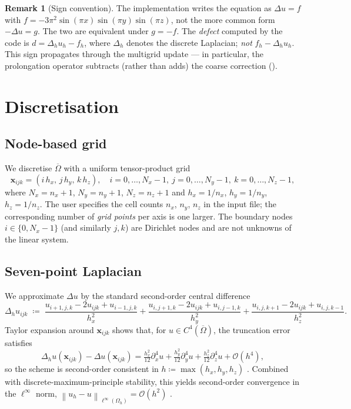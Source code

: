 \documentclass[11pt]{article}
\theoremstyle{definition}
\newtheorem{remark}[theorem]{Remark}
\newcommand{\bx}{\mathbf{x}}
\newcommand{\norm}[1]{\left\lVert #1 \right\rVert}
\newcommand{\bigO}{\mathcal{O}}
\begin{document}
\begin{remark}[Sign convention]
The implementation writes the equation as $\Delta u = f$ with $f =
-3\pi^2 \sin(\pi x)\sin(\pi y)\sin(\pi z)$, not the more common form
$-\Delta u = g$.  The two are equivalent under $g=-f$.  The
\emph{defect} computed by the code is
$d = \Delta_h u_h - f_h$, where $\Delta_h$ denotes the discrete
Laplacian; \emph{not} $f_h - \Delta_h u_h$.  This sign propagates
through the multigrid update --- in particular, the prolongation
operator subtracts (rather than adds) the coarse correction
().
\end{remark}

\section{Discretisation}\label{sec:discretisation}

\subsection{Node-based grid}
We discretise $\overline{\Omega}$ with a uniform tensor-product grid
\begin{equation*}
  \bx_{ijk} = (i\,h_x,\,j\,h_y,\,k\,h_z),\quad
  i=0,\dots,N_x-1,\ j=0,\dots,N_y-1,\ k=0,\dots,N_z-1,
\end{equation*}
where $N_x = n_x+1$, $N_y = n_y+1$, $N_z = n_z+1$ and $h_x = 1/n_x$,
$h_y = 1/n_y$, $h_z = 1/n_z$.  The user specifies the cell counts $n_x$,
$n_y$, $n_z$ in the input file; the corresponding number of
\emph{grid points} per axis is one larger.  The boundary nodes $i\in\{0,N_x-1\}$
(and similarly $j,k$) are Dirichlet nodes and are not unknowns of the
linear system.

\subsection{Seven-point Laplacian}
We approximate $\Delta u$ by the standard second-order central
difference
\begin{equation}\label{eq:laplacian-7pt}
  \Delta_h u_{ijk} \;\coloneqq\;
  \frac{u_{i+1,j,k}-2u_{ijk}+u_{i-1,j,k}}{h_x^2}
  +\frac{u_{i,j+1,k}-2u_{ijk}+u_{i,j-1,k}}{h_y^2}
  +\frac{u_{i,j,k+1}-2u_{ijk}+u_{i,j,k-1}}{h_z^2}.
\end{equation}
Taylor expansion around $\bx_{ijk}$ shows that, for $u\in C^4(\overline\Omega)$,
the truncation error satisfies
\begin{equation}\label{eq:truncation}
  \Delta_h u(\bx_{ijk}) - \Delta u(\bx_{ijk})
  = \tfrac{h_x^2}{12} \partial_x^4 u + \tfrac{h_y^2}{12}\partial_y^4 u
  + \tfrac{h_z^2}{12}\partial_z^4 u + \bigO(h^4),
\end{equation}
so the scheme is second-order consistent in $h\coloneqq\max(h_x,h_y,h_z)$
\cite[Ch.~2]{leveque2007finite}.  Combined with discrete-maximum-principle
stability, this yields second-order convergence in the $\ell^\infty$ norm,
$\norm{u_h - u}_{\ell^\infty(\Omega_h)} = \bigO(h^2)$
\cite[Ch.~2--3]{leveque2007finite}.
\end{document}
